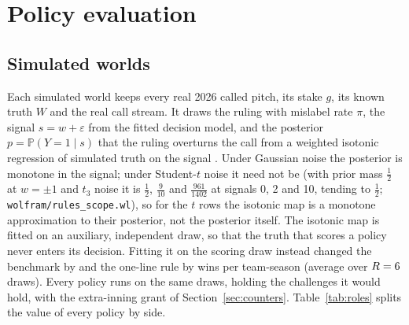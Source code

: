 \documentclass[aoas]{imsart}
\theoremstyle{plain}
\theoremstyle{definition}
\newcommand{\Prob}{\mathbb{P}}
\begin{document}
\section{Policy evaluation}\label{sec:policy}

\subsection{Simulated worlds}
Each simulated world keeps every real 2026 called pitch, its stake $g$, its known truth $W$ and the real call stream.
It draws the ruling with mislabel rate $\pi$, the signal $s=w+\varepsilon$ from the fitted decision model, and the
posterior $p=\Prob(Y=1\mid s)$ that the ruling overturns the call from a weighted isotonic regression of simulated truth on the signal
\citep{BarlowEtAl1972}. Under Gaussian noise the posterior is monotone in the signal; under Student-$t$ noise it need
not be (with prior mass $\tfrac12$ at $w=\pm1$ and $t_3$ noise it is $\tfrac12$, $\tfrac9{10}$ and $\tfrac{961}{1402}$
at signals 0, 2 and 10, tending to $\tfrac12$; \texttt{wolfram/rules\_scope.wl}), so for the $t$ rows the isotonic
map is a monotone approximation to their posterior, not the posterior itself. The isotonic map is fitted on an auxiliary, independent draw, so that the truth that scores a
policy never enters its decision. Fitting it on the scoring draw instead changed the benchmark by \SCrossFitOpt{} and the
one-line rule by \SCrossFitRule{} wins per team-season (average over $R=6$ draws). Every policy runs on the
same draws, holding the challenges it would hold, with the extra-inning grant of Section~\ref{sec:counters}.
Table~\ref{tab:roles} splits the value of every policy by side.

\begin{table}[!htbp]
\caption{Wins per team-season by side and challenges per team-game (95\% game-bootstrap interval); the comparator with
the stakes cross-fitted only (Table~\ref{tab:oldpolicies}).}\label{tab:roles}
\centering\small

\end{table}
\end{document}
